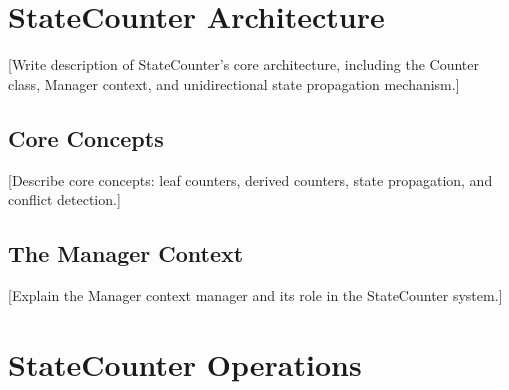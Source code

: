 \documentclass[11pt]{article}
\begin{document}
\section{StateCounter Architecture}
\label{sec:statecounter-architecture}

%

[Write description of StateCounter's core architecture, including the Counter class,
Manager context, and unidirectional state propagation mechanism.]

\subsection{Core Concepts}
\label{subsec:statecounter-concepts}

%

[Describe core concepts: leaf counters, derived counters, state propagation, 
and conflict detection.]

\subsection{The Manager Context}
\label{subsec:manager}

%

[Explain the Manager context manager and its role in the StateCounter system.]



\section{StateCounter Operations}
\label{sec:statecounter-operations}
\end{document}
